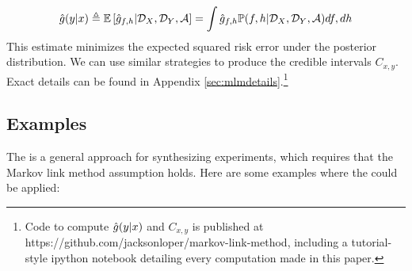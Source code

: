 \[
\hat {g}(y|x) \triangleq \mathbb{E}\left[\hat {g}_{f,h} | {\mathcal{D}_X},{\mathcal{D}_Y},\mathcal{A} \right]
               = \int \hat {g}_{f,h} \mathbb{P}(f,h | {\mathcal{D}_X},{\mathcal{D}_Y},\mathcal{A}) df,dh
\]
This estimate minimizes the expected squared risk error under the posterior distribution.  We can use similar strategies to produce the credible intervals $C_{x,y}$.  Exact details can be found in Appendix \ref{sec:mlmdetails}.\footnote{Code to compute $\hat {g}(y|x)$ and $C_{x,y}$ is published at https://github.com/jacksonloper/markov-link-method, including a tutorial-style ipython notebook detailing every computation made in this paper.}


\subsection{Examples}

\label{sec:examples}

The \MLM{} is a general approach for synthesizing experiments, which requires that the Markov link method assumption holds.  Here are some examples where the \MLM{} could be applied:

